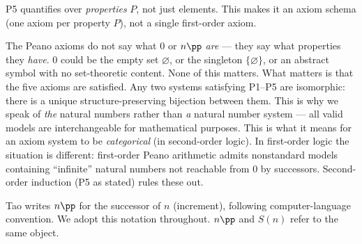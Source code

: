 \begin{remark}
P5 quantifies over \emph{properties} $P$, not just elements.
This makes it an axiom schema (one axiom per property $P$),
not a single first-order axiom.
\end{remark}

\begin{remark}
The Peano axioms do not say what $0$ or $n\pp$ \emph{are} ---
they say what properties they \emph{have}.
$0$ could be the empty set $\varnothing$, or the singleton
$\{\varnothing\}$, or an abstract symbol with no set-theoretic
content. None of this matters. What matters is that the five
axioms are satisfied. Any two systems satisfying P1--P5 are
isomorphic: there is a unique structure-preserving bijection
between them. This is why we speak of \emph{the} natural numbers
rather than \emph{a} natural number system --- all valid models
are interchangeable for mathematical purposes.
This is what it means for an axiom system to be
\emph{categorical} (in second-order logic).
In first-order logic the situation is different: first-order
Peano arithmetic admits nonstandard models containing
``infinite'' natural numbers not reachable from $0$ by
successors. Second-order induction (P5 as stated) rules
these out.
\end{remark}

\begin{remark}
Tao writes $n\pp$ for the successor of $n$ (increment), following
computer-language convention. We adopt this notation throughout.
$n\pp$ and $S(n)$ refer to the same object.
\end{remark}